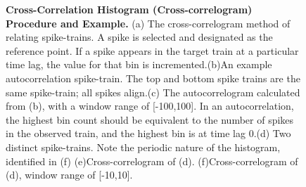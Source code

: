 \documentclass[11pt,titlepage]{article}
\begin{document}
\begin{figure}[H]
\begin{minipage}{.49\linewidth}
\captionsetup{position=top}
\centering
{}
\end{minipage}
\begin{minipage}{.5\linewidth}
\captionsetup{position=top}
\centering
{}
\end{minipage}
\begin{minipage}{.49\linewidth}
\captionsetup{position=top}
\centering
{}
\end{minipage}
\begin{minipage}{.5\linewidth}
\captionsetup{position=top}
\centering
{}
\end{minipage}
\begin{minipage}{.49\linewidth}
\captionsetup{position=top}
\centering
{}
\end{minipage}
\begin{minipage}{.5\linewidth}
\captionsetup{position=top}
\centering
{}
\end{minipage}

\caption[Cross-Correlation Histogram (Cross-correlogram) Procedure and Example.]{\textbf{Cross-Correlation Histogram (Cross-correlogram) Procedure and Example.} (a) The cross-correlogram method of relating spike-trains. A spike is selected and designated as the reference point. If a spike appears in the target train at a particular time lag, the value for that bin is incremented.(b)An example autocorrelation spike-train. The top and bottom spike trains are the same spike-train; all spikes align.(c) The autocorrelogram calculated from (b), with a window range of [-100,100]. In an autocorrelation, the highest bin count should be equivalent to the number of spikes in the observed train, and the highest bin is at time lag 0.(d) Two distinct spike-trains. Note the periodic nature of the histogram, identified in (f) (e)Cross-correlogram of (d). (f)Cross-correlogram of (d), window range of [-10,10].}
\label{fig:main}
\end{figure}
\end{document}
